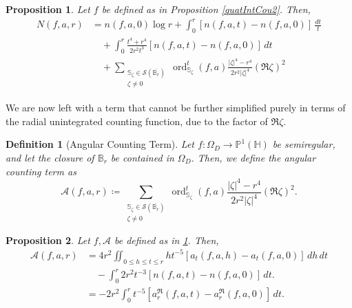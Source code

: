 \documentclass[10pt,a4paper]{amsart}
\newtheorem{prop}{Proposition}
\newtheorem{defin}{Definition}
\newcommand{\A}{\mathcal{A}}
\newcommand{\hp}{{\mathbb{P}^1(\mathbb{H})}}
\newcommand{\ordt}{\operatorname{ord}^t}
\newcommand{\s}{{\mathbb{S}}}
\begin{document}
\begin{prop}\label{quaIntCou3}
    Let $f$ be defined as in Proposition \ref{quatIntCou2}. Then, \begin{align*}
        N(f,a,r) &= n(f,a,0)\log r + \int_0^r[n(f,a,t)-n(f,a,0)]\,\frac{dt}{t} \\
        &\quad +  \int_0^r\frac{t^4+r^4}{2r^2t^3}[n(f,a,t)-n(f,a,0)]\,dt \\ 
        &\quad + \sum_{\substack{ \s_\zeta\in\mathcal{S}(\overline{\mathbb B_r}) \\ \zeta\neq 0}}
        \ordt_{\s_\zeta}(f,a) \frac{|\zeta|^4-r^4}{2r^2|\zeta|^4}(\Re \zeta)^2
    \end{align*}
\end{prop}

We are now left with a term that cannot be further simplified purely in terms of the radial unintegrated counting function, due to the factor of $\Re\zeta $. 
\begin{defin}[Angular Counting Term]\label{AngularCountingTerm}
     Let $f:\Omega_D\to\hp$ be semiregular, and let the closure of $\mathbb{B}_r$ be contained in $\Omega_D$. Then, we define the angular counting term as \[ \A(f,a,r)\coloneq \sum_{\substack{ \s_\zeta\in\mathcal{S}(\overline{\mathbb B_r}) \\ \zeta\neq 0}}
        \ordt_{\s_\zeta}(f,a) \frac{|\zeta|^4-r^4}{2r^2|\zeta|^4}(\Re \zeta)^2.\]
\end{defin}

\begin{prop}
    Let $f, \A$ be defined as in \ref{AngularCountingTerm}. Then, \begin{align*}
        \A(f,a,r)&=4r^2\iint_{0\leq h\leq t\leq r} ht^{-5}[a_t(f,a,h)-a_t(f,a,0)]\, dh\, dt \\&\quad - \int_0^r 2r^2t^{-3}[n(f,a,t)-n(f,a,0)]\,dt. \\
        &= -2r^2\int_0^rt^{-5}[a_r^\Re(f,a,t)-a_r^\Re(f,a,0)]\,dt.  \\
    \end{align*}
\end{prop}
\end{document}
